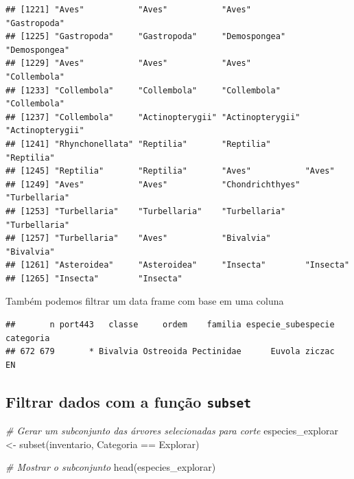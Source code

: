 \documentclass[
]{article}
\newenvironment{Shaded}{\begin{snugshade}}{\end{snugshade}}
\newcommand{\CommentTok}[1]{\textcolor[rgb]{0.56,0.35,0.01}{\textit{#1}}}
\newcommand{\FunctionTok}[1]{\textcolor[rgb]{0.00,0.00,0.00}{#1}}
\newcommand{\NormalTok}[1]{#1}
\newcommand{\OtherTok}[1]{\textcolor[rgb]{0.56,0.35,0.01}{#1}}
\newcommand{\SpecialCharTok}[1]{\textcolor[rgb]{0.00,0.00,0.00}{#1}}
\newcommand{\StringTok}[1]{\textcolor[rgb]{0.31,0.60,0.02}{#1}}
\begin{document}
\begin{verbatim}
## [1221] "Aves"           "Aves"           "Aves"           "Gastropoda"    
## [1225] "Gastropoda"     "Gastropoda"     "Demospongea"    "Demospongea"   
## [1229] "Aves"           "Aves"           "Aves"           "Collembola"    
## [1233] "Collembola"     "Collembola"     "Collembola"     "Collembola"    
## [1237] "Collembola"     "Actinopterygii" "Actinopterygii" "Actinopterygii"
## [1241] "Rhynchonellata" "Reptilia"       "Reptilia"       "Reptilia"      
## [1245] "Reptilia"       "Reptilia"       "Aves"           "Aves"          
## [1249] "Aves"           "Aves"           "Chondrichthyes" "Turbellaria"   
## [1253] "Turbellaria"    "Turbellaria"    "Turbellaria"    "Turbellaria"   
## [1257] "Turbellaria"    "Aves"           "Bivalvia"       "Bivalvia"      
## [1261] "Asteroidea"     "Asteroidea"     "Insecta"        "Insecta"       
## [1265] "Insecta"        "Insecta"
\end{verbatim}

Também podemos filtrar um data frame com base em uma coluna

\begin{Shaded}
\end{Shaded}

\begin{verbatim}
##       n port443   classe     ordem    familia especie_subespecie categoria
## 672 679       * Bivalvia Ostreoida Pectinidae      Euvola ziczac        EN
\end{verbatim}

\hypertarget{filtrar-dados-com-a-funuxe7uxe3o-subset}{%
\subsection{\texorpdfstring{Filtrar dados com a função
\texttt{subset}}{Filtrar dados com a função subset}}\label{filtrar-dados-com-a-funuxe7uxe3o-subset}}

\begin{Shaded}
\begin{Highlighting}[]
\CommentTok{\# Gerar um subconjunto das árvores selecionadas para corte}
\NormalTok{especies\_explorar }\OtherTok{\textless{}{-}} \FunctionTok{subset}\NormalTok{(inventario, Categoria }\SpecialCharTok{==} \StringTok{\textquotesingle{}Explorar\textquotesingle{}}\NormalTok{)}

\CommentTok{\# Mostrar o subconjunto }
\FunctionTok{head}\NormalTok{(especies\_explorar)}
\end{Highlighting}
\end{Shaded}
\end{document}
